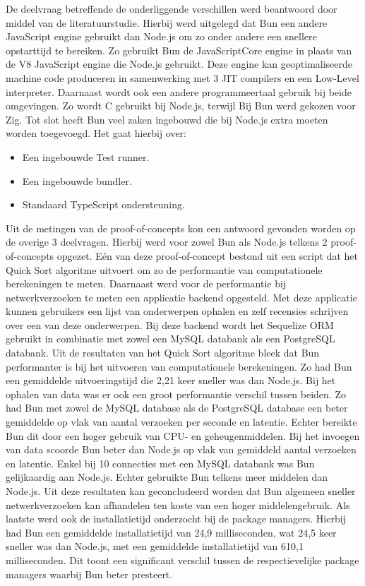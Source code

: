 De deelvraag betreffende de onderliggende verschillen werd beantwoord door middel van de literatuurstudie.
Hierbij werd uitgelegd dat Bun een andere JavaScript engine gebruikt dan Node.js om zo onder andere een snellere opstarttijd te bereiken.
Zo gebruikt Bun de JavaScriptCore engine in plaats van de V8 JavaScript engine die Node.js gebruikt.
Deze engine kan geoptimaliseerde machine code produceren in samenwerking met 3 JIT compilers en een Low-Level interpreter.
Daarnaast wordt ook een andere programmeertaal gebruik bij beide omgevingen. Zo wordt C gebruikt bij Node.js, terwijl Bij Bun werd gekozen voor Zig.
Tot slot heeft Bun veel zaken ingebouwd die bij Node.js extra moeten worden toegevoegd.
Het gaat hierbij over:
\begin{itemize}
    \item Een ingebouwde Test runner.
    \item Een ingebouwde bundler.
    \item Standaard TypeScript ondersteuning.
\end{itemize}
Uit de metingen van de proof-of-concepts kon een antwoord gevonden worden op de overige 3 deelvragen.
Hierbij werd voor zowel Bun als Node.js telkens 2 proof-of-concepts opgezet. 
Eén van deze proof-of-concept bestond uit een script dat het Quick Sort algoritme uitvoert om zo de performantie van computationele berekeningen te meten.
Daarnaast werd voor de performantie bij netwerkverzoeken te meten een applicatie backend opgesteld. Met deze applicatie kunnen gebruikers
een lijst van onderwerpen ophalen en zelf recensies schrijven over een van deze onderwerpen.
Bij deze backend wordt het Sequelize ORM gebruikt in combinatie met zowel een MySQL databank als een PostgreSQL databank.
Uit de resultaten van het Quick Sort algoritme bleek dat Bun performanter is bij het uitvoeren van computationele berekeningen.
Zo had Bun een gemiddelde uitvoeringstijd die 2,21 keer sneller was dan Node.js.
Bij het ophalen van data was er ook een groot performantie verschil tussen beiden. Zo had Bun met zowel de MySQL database als de PostgreSQL database 
een beter gemiddelde op vlak van aantal verzoeken per seconde en latentie. Echter bereikte Bun dit door een hoger gebruik van CPU- en geheugenmiddelen.
Bij het invoegen van data scoorde Bun beter dan Node.js op vlak van gemiddeld aantal verzoeken en latentie.
Enkel bij 10 connecties met een MySQL databank was Bun gelijkaardig aan Node.js.
Echter gebruikte Bun telkens meer middelen dan Node.js.
Uit deze resultaten kan geconcludeerd worden dat Bun algemeen sneller netwerkverzoeken kan afhandelen
ten koste van een hoger middelengebruik.
Als laatste werd ook de installatietijd onderzocht bij de package managers. Hierbij had Bun een 
gemiddelde installatietijd van 24,9 milliseconden, wat 24,5 keer sneller was dan Node.js, met een gemiddelde installatietijd van 610,1 milliseconden.
Dit toont een significant verschil tussen de respectievelijke package managers waarbij Bun beter presteert.

